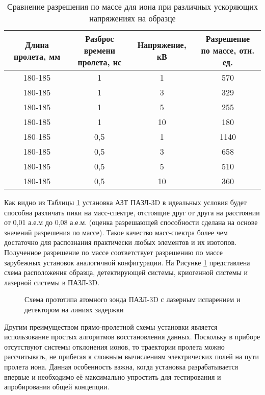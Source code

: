 \begin{table} [htbp]
	\centering
	\caption{Сравнение разрешения по массе для иона при различных ускоряющих напряжениях на образце}
	\label{tab:calcFWHM}
	\begin{SingleSpace}
		\begin{tabular} {| c | c | c | c |}
			\hline
			Длина пролета, мм & \thead{Разброс времени\\ пролета, нс} & Напряжение, кВ & \thead{Разрешение \\по массе, отн. ед.}  \\ \hline
			180-185 & 1 & 1  &  570               \\ \hline
			180-185 & 1 & 3  &  329               \\ \hline
			180-185 & 1 & 5  &  255               \\ \hline
			180-185 & 1 & 10 &  180               \\ \hline
			180-185 & 0,5 & 1  &  1140               \\ \hline
			180-185 & 0,5 & 3  &  658               \\ \hline
			180-185 & 0,5 & 5  &  510               \\ \hline
			180-185 & 0,5 & 10 &  360               \\ \hline
		\end{tabular}
	\end{SingleSpace}
\end{table}

Как видно из Таблицы \cref{tab:calcFWHM} установка АЗТ ПАЗЛ-3D в идеальных условия будет способна различать пики на масс-спектре, отстоящие друг от друга на расстоянии от 0,01 а.е.м до 0,08 а.е.м. (оценка разрешающей способности сделана на основе значений разрешения по массе). Такое качество масс-спектра более чем достаточно для распознания практически любых элементов и их изотопов. Полученное разрешение по массе соответствует разрешению по массе зарубежных установок аналогичной конфигурации. На Рисунке \cref{fig:main_scheme} представлена схема расположения образца, детектирующей системы, криогенной системы и лазерной системы в ПАЗЛ-3D.

\begin{figure}[htb]
	\caption{Схема прототипа атомного зонда ПАЗЛ-3D с лазерным испарением и детектором на линиях задержки}
	\label{fig:main_scheme}
\end{figure}
  
Другим преимуществом прямо-пролетной схемы установки является использование простых алгоритмов восстановления данных. Поскольку в приборе отсутствуют системы отклонения ионов, то траектории пролета можно рассчитывать, не прибегая к сложным вычислениям электрических полей на пути пролета иона. Данная особенность важна, когда установка разрабатывается впервые и необходимо её максимально упростить для тестирования и апробирования общей концепции.

